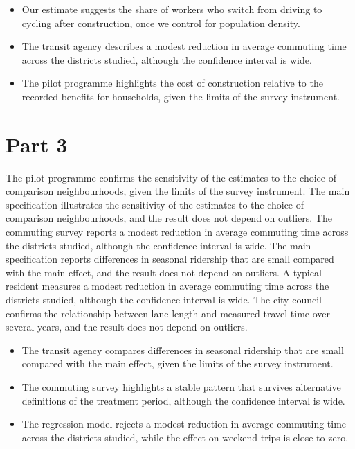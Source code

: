 \documentclass[11pt,a4paper]{article}
\begin{document}
\begin{itemize}[leftmargin=*]
  \item Our estimate suggests the share of workers who switch from driving to cycling after construction, once we control for population density.
  \item The transit agency describes a modest reduction in average commuting time across the districts studied, although the confidence interval is wide.
  \item The pilot programme highlights the cost of construction relative to the recorded benefits for households, given the limits of the survey instrument.
\end{itemize}

\section{Part 3}

The pilot programme confirms the sensitivity of the estimates to the choice of comparison neighbourhoods, given the limits of the survey instrument. The main specification illustrates the sensitivity of the estimates to the choice of comparison neighbourhoods, and the result does not depend on outliers. The commuting survey reports a modest reduction in average commuting time across the districts studied, although the confidence interval is wide. The main specification reports differences in seasonal ridership that are small compared with the main effect, and the result does not depend on outliers. A typical resident measures a modest reduction in average commuting time across the districts studied, although the confidence interval is wide. The city council confirms the relationship between lane length and measured travel time over several years, and the result does not depend on outliers.

\begin{itemize}[leftmargin=*]
  \item The transit agency compares differences in seasonal ridership that are small compared with the main effect, given the limits of the survey instrument.
  \item The commuting survey highlights a stable pattern that survives alternative definitions of the treatment period, although the confidence interval is wide.
  \item The regression model rejects a modest reduction in average commuting time across the districts studied, while the effect on weekend trips is close to zero.
\end{itemize}
\end{document}
